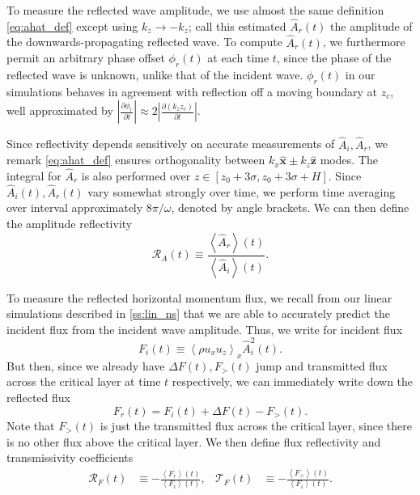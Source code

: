 \documentclass[
        fleqn,
        usenatbib,
    ]{mnras}
\newcommand*{\pd}[2]{\frac{\partial#1}{\partial#2}}
\newcommand*{\abs}[1]{\left|#1\right|}
\newcommand*{\ev}[1]{\left\langle#1\right\rangle}
\newcommand*{\uv}[1]{\hat{\mathbf{#1}}}
\begin{document}
To measure the reflected wave amplitude, we use almost the same definition
\autoref{eq:ahat_def} except using $k_{z} \to -k_{z}$; call this estimated
$\hat{A}_r(t)$ the amplitude of the downwards-propagating reflected wave. To
compute $\hat{A}_r(t)$, we furthermore permit an arbitrary phase offset
$\phi_r(t)$ at each time $t$, since the phase of the reflected wave is unknown,
unlike that of the incident wave. $\phi_r(t)$ in our simulations
behaves in agreement with reflection off a moving boundary at $z_c$,
well approximated by $\abs{\pd{\phi_r}{t}} \approx 2\abs{\pd{(k_{z}z_c)}{t}}$.

Since reflectivity depends sensitively on accurate measurements of $\hat{A}_i,
\hat{A}_r$, we remark \autoref{eq:ahat_def} ensures orthogonality between
$k_{x}\uv{x} \pm k_{z}\uv{z}$ modes. The integral for $\hat{A}_r$ is also
performed over $z \in [z_0 + 3\sigma, z_0 + 3\sigma + H]$. Since
$\hat{A}_i(t), \hat{A}_r(t)$ vary somewhat strongly over time, we perform time
averaging over interval approximately $8\pi/\omega$, denoted by angle brackets.
We can then define the amplitude reflectivity
\begin{equation}
    \mathcal{R}_A(t) \equiv \frac{\ev{\hat{A}_r}(t)}{\ev{\hat{A}_i}(t)}
        .\label{eq:Ra_def}
\end{equation}

To measure the reflected horizontal momentum flux, we recall from our linear
simulations described in \autoref{ss:lin_ns} that we are able to accurately
predict the incident flux from the incident wave amplitude. Thus, we write for
incident flux
\begin{equation}
    F_i(t) \equiv \ev{\rho u_{x} u_{z}}_x\hat{A}_i^2(t).
\end{equation}
But then, since we already have $\Delta F(t), F_>(t)$ jump and transmitted flux
across the critical layer at time $t$ respectively, we can immediately write
down the reflected flux
\begin{equation}
    F_r(t) = F_i(t) + \Delta F(t) - F_>(t).
\end{equation}
Note that $F_>(t)$ is just the transmitted flux across the critical layer, since
there is no other flux above the critical layer. We then define flux
reflectivity and transmissivity coefficients
\begin{align}
    \mathcal{R}_F(t) &\equiv -\frac{\ev{F_r}(t)}{\ev{F_i}(t)},&
    \mathcal{T}_F(t) &\equiv -\frac{\ev{F_>}(t)}{\ev{F_i}(t)}.
        \label{eq:srefl_def}
\end{align}
\end{document}
